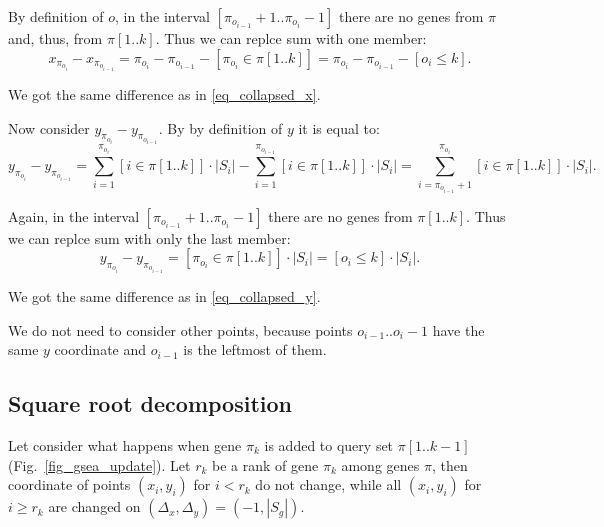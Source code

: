 \documentclass[runningheads,a4paper]{llncs}
\begin{document}
By definition of $o$, in the interval 
$[\pi_{o_{i-1}} + 1..\pi_{o_{i}} -1]$ there are no genes from $\pi$ and,
thus, from $\pi[1..k]$. Thus we can replce sum with one member:
\[
    x_{\pi_{o_i}} - x_{\pi_{o_{i-1}}} = 
        \pi_{o_i} - \pi_{o_{i-1}} - [\pi_{o_i} \in \pi [1..k]] = 
        \pi_{o_i} - \pi_{o_{i-1}} - [o_i \le k].
\]

We got the same difference as in \eqref{eq_collapsed_x}.

Now consider $y_{\pi_{o_i}} - y_{\pi_{o_{i-1}}}$. By by definition of $y$ 
it is equal to:
\[
    y_{\pi_{o_i}} - y_{\pi_{o_{i-1}}} = 
        \sum_{i=1}^{\pi_{o_i}} [i \in \pi [1..k]] \cdot |S_i| - 
        \sum_{i=1}^{\pi_{o_{i-1}}} [i \in \pi [1..k]] \cdot |S_i| =  
        \sum_{i=\pi_{o_{i-1}} + 1}^{\pi_{o_i}} [i \in \pi [1..k]] \cdot |S_i|.
\]

Again, in the interval $[\pi_{o_{i-1}} + 1..\pi_{o_{i}} -1]$ 
there are no genes from $\pi[1..k]$. Thus we can replce sum with only the
last member:
\[
    y_{\pi_{o_i}} - y_{\pi_{o_{i-1}}} = 
        [\pi_{o_i} \in \pi [1..k]] \cdot |S_i| = 
        [o_i \le k] \cdot |S_i|.
\]

We got the same difference as in \eqref{eq_collapsed_y}.

We do not need to consider other points, because points 
$o_{i-1}..o_i-1$ have the same $y$ coordinate
and $o_{i-1}$ is the leftmost of them.


\subsection{Square root decomposition}


Let consider what happens when gene $\pi_k$ is added to query set $\pi[1..k-1]$ 
(Fig.~\ref{fig_gsea_update}).
Let $r_k$ be a rank of gene $\pi_k$ among genes $\pi$,
then 
coordinate of points $(x_i, y_i)$ for $i < r_k$ 
do not change, while all $(x_i, y_i)$ for $i \ge r_k$ are changed on
$(\Delta_x,\Delta_y) = (-1, |S_g|)$.
\end{document}
